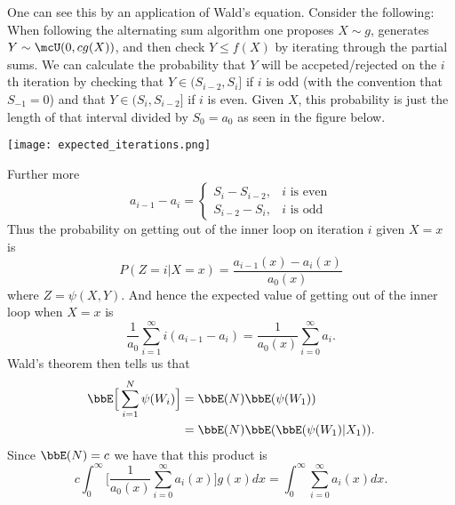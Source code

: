 \documentclass{article}
\begin{document}
One can see this by an application of Wald's equation.  Consider the following:
When following the alternating sum algorithm one proposes $X \sim g$, generates
$Y \sim \mcU(0, cg(X))$, and then check $Y \leq f(X)$ by iterating through the
partial sums.  We can calculate the probability that $Y$ will be
accpeted/rejected on the $i$th iteration by checking that $Y \in (S_{i-2}, S_i]$
if $i$ is odd (with the convention that $S_{-1} = 0$) and that $Y
\in (S_i, S_{i-2}]$ if $i$ is even.  Given $X$, this probability is just the
length of that interval divided by $S_0 = a_0$ as seen in the figure below.
\begin{center}
\texttt{[image: expected\_iterations.png]}
\end{center}
Further more
\[
a_{i-1} - a_{i} = 
\begin{cases}
S_{i} - S_{i-2}, & \text{$i$ is even} \\
S_{i-2} - S_i, & \text{$i$ is odd}
\end{cases}
\]
Thus the probability on getting out of the inner loop on iteration $i$ given $X=x$
is
\[
P(Z = i | X = x) = \frac{a_{i-1}(x) - a_i(x)}{a_0(x)}
\]
where $Z = \psi(X, Y)$.  And hence the expected value of
getting out of the inner loop when $X=x$ is
\[
\frac{1}{a_0} \sum_{i=1}^\infty i (a_{i-1} - a_i) = \frac{1}{a_0(x)}
\sum_{i=0}^\infty a_i.
\]
Wald's theorem then tells us that
\begin{align*}
\bbE \Big[ \sum_{i=1}^N \psi(W_i) \Big] 
& = \bbE(N) \bbE(\psi(W_1)) \\
& = \bbE(N) \bbE( \bbE(\psi(W_1)|X_1) ).
\end{align*}
Since $\bbE(N) = c$ we have that this product is
\[
c \int_{0}^\infty \Big[ \frac{1}{a_0(x)} \sum_{i=0}^\infty a_i(x) \Big] g(x) dx
= \int_{0}^\infty \sum_{i=0}^\infty a_i(x) dx.
\]
\end{document}
